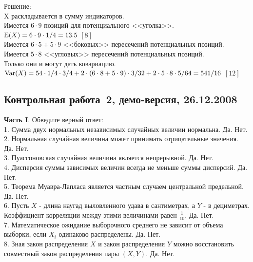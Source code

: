 \documentclass[pdftex,12pt,a4paper]{article}
\begin{document}
Решение: \\
X раскладывается в сумму индикаторов.\\
Имеется $6\cdot9$ позиций для потенциального <<уголка>>. \\
$\mathbb{E}(X)=6\cdot9\cdot1/4=13.5$ $[8]$ \\
Имеется $6\cdot5+5\cdot9$ <<боковых>> пересечений потенциальных позиций. \\
Имеется $5\cdot8$ <<угловых>> пересечений потенциальных позиций. \\
Только они и могут дать ковариацию. \\
$\operatorname{Var}(X)=54\cdot1/4\cdot3/4+2\cdot(6\cdot8+5\cdot9)\cdot3/32+2\cdot5\cdot8\cdot5/64=541/16$ $[12]$\\



\subsection{Контрольная работа \No\,2, демо-версия, 26.12.2008}

\textbf{Часть I}. Обведите верный ответ: \\

1. Сумма двух нормальных независимых случайных величин нормальна.
Да. Нет. \\

2. Нормальная случайная величина может принимать отрицательные
значения. Да. Нет. \\

3. Пуассоновская случайная величина является непрерывной. Да. Нет.
\\

4. Дисперсия суммы зависимых величин всегда не меньше суммы
дисперсий. Да. Нет. \\

5. Теорема Муавра-Лапласа является частным случаем центральной
предельной. Да. Нет. \\

6. Пусть $X$ - длина наугад выловленного удава в сантиметрах, а
$Y$ - в дециметрах. Коэффициент корреляции между этими
величинами равен $\frac{1}{10}$. Да. Нет. \\

7. Математическое ожидание выборочного среднего не зависит от
объема выборки, если $X_{i}$ одинаково распределены. Да. Нет. \\

8. Зная закон распределения $X$ и закон распределения $Y$
можно восстановить совместный закон распределения пары $(X,Y)$. Да. Нет. \\
\end{document}
